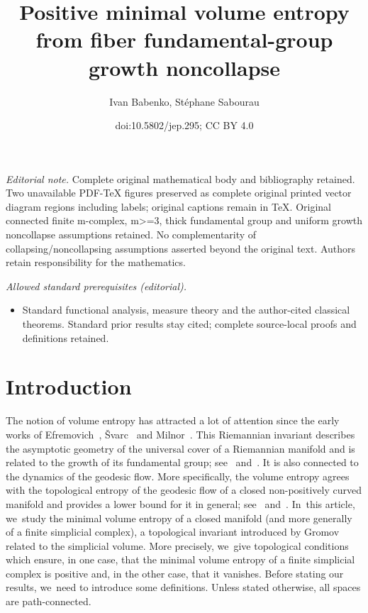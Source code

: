 \documentclass[10pt]{amsart}
\title{Positive minimal volume entropy from fiber fundamental-group growth noncollapse}
\author{Ivan Babenko, Stéphane Sabourau}
\date{doi:10.5802/jep.295; CC BY 4.0}
\theoremstyle{definition}
\providecommand{\mainmatter}{}\providecommand{\backmatter}{}
\begin{document}
\maketitle
\noindent\textit{Editorial note.} Complete original mathematical body and bibliography retained. Two unavailable PDF-TeX figures preserved as complete original printed vector diagram regions including labels; original captions remain in TeX. Original connected finite m-complex, m>=3, thick fundamental group and uniform growth noncollapse assumptions retained. No complementarity of collapsing/noncollapsing assumptions asserted beyond the original text. Authors retain responsibility for the mathematics.\par\medskip
\noindent\textit{Allowed standard prerequisites (editorial).}\begin{itemize}
\item Standard functional analysis, measure theory and the author-cited classical theorems. Standard prior results stay cited; complete source-local proofs and definitions retained.
\end{itemize}\medskip

\tableofcontents
\mainmatter

\section{Introduction}

The notion of volume entropy has attracted a lot of attention since the early works of Efremovich~\cite{Efrem53}, \v{S}varc~\cite{Shvarts55} and Milnor~\cite{Milnor68}.
This Riemannian invariant describes the asymptotic geometry of the universal cover of a Riemannian manifold and is related to the growth of its fundamental group; see~\cite{Shvarts55} and~\cite{Milnor68}.
It is also connected to the dynamics of the geodesic flow.
More specifically, the volume entropy agrees with the topological entropy of the geodesic flow of a closed non-positively curved manifold and provides a lower bound for it in general; see~\cite{Dinaburg71} and~\cite{Manning79}. In~this article, we~study the minimal volume entropy of a closed manifold (and more generally of a finite simplicial complex), a topological invariant introduced by Gromov~\cite{gro82} related to the simplicial volume.
More precisely, we~give topological conditions which ensure, in one case, that the minimal volume entropy of a finite simplicial complex is positive and, in the other case, that it vanishes.
Before stating our results, we~need to introduce some definitions.
Unless stated otherwise, all spaces are path-connected.
\end{document}
